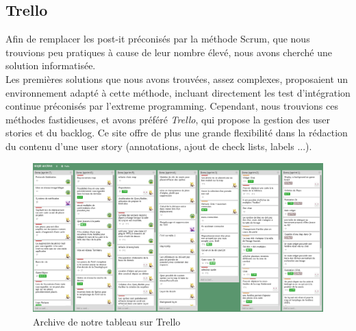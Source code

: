 \subsection{Trello}

Afin de remplacer les post-it préconisés par la méthode Scrum, que nous trouvions peu pratiques à cause de leur nombre élevé, nous avons cherché une solution informatisée. \\

Les premières solutions que nous avons trouvées, assez complexes, proposaient un environnement adapté à cette méthode, incluant directement les test d'intégration continue préconisés par l'extreme programming. Cependant, nous trouvions ces méthodes fastidieuses, et avons préféré \textit{Trello}, qui propose la gestion des user stories et du backlog.
Ce site offre de plus une grande flexibilité dans la rédaction du contenu d'une user story (annotations, ajout de check lists, labels ...).

\begin{figure}[h!]
	\centering
	\includegraphics[width=\textwidth]{img/trello_archive.png}
	\caption{Archive de notre tableau sur Trello}
	\label{fig:trello}
\end{figure}
